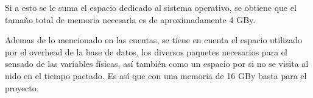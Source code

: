 Si a esto se le suma el espacio dedicado al sistema operativo, se obtiene que el tamaño total de memoria necesaria es de aproximadamente 4 GBy.

Ademas de lo mencionado en las cuentas, se tiene en cuenta el espacio utilizado por el overhead de la base de datos, los diversos paquetes necesarios para el sensado de las variables físicas, así también como un espacio por si no se visita al nido en el tiempo pactado. Es así que con una memoria de 16 GBy basta para el proyecto.
